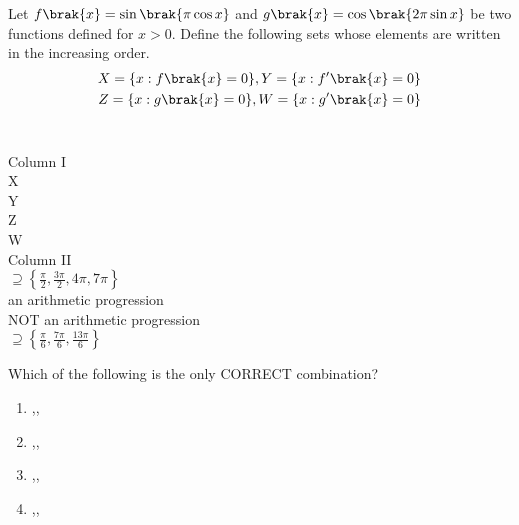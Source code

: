 \item Let $f\brak{x} = \sin\brak{\pi \cos x}$ and $g\brak{x} = \cos\brak{2\pi \sin x}$ be two functions defined for $x > 0$. Define the following sets whose elements are written in the increasing order. \hfill{}
\begin{align}
X=\{x:f\brak{x}=0\},Y=\{x:f'\brak{x}=0\}\\
Z=\{x:g\brak{x}=0\}, W=\{x:g'\brak{x}=0\}
\end{align}
\\
\begin{multicols}{2}
Column I
\\
 X
\\
 Y
\\
 Z
\\
 W
\columnbreak
\\
Column II
\\
 $\supseteq \left\{ \frac{\pi}{2}, \frac{3\pi}{2}, 4\pi, 7\pi \right\}$
\\
an arithmetic progression
\\
NOT an arithmetic progression
\\
$\supseteq\left\{\frac{\pi}{6},\frac{7\pi}{6},\frac{13\pi}{6}\right\}$


\end{multicols}
Which of the following is the only CORRECT combination?
\begin{enumerate}[label=(\alph*)]
\item{},,
\item{},,
\item{},,
\item{},,
\end{enumerate}
